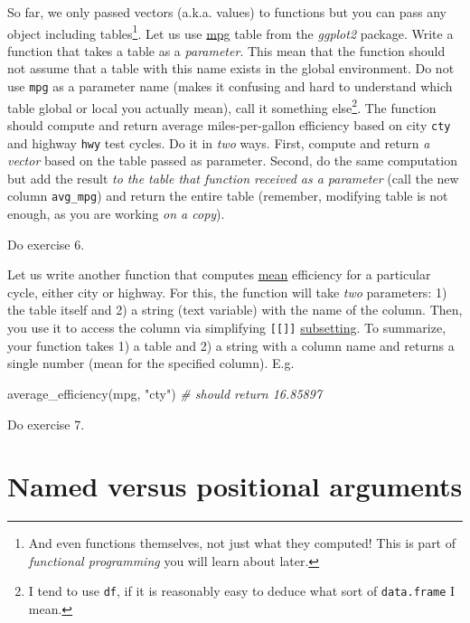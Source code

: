 \documentclass[
]{book}
\newenvironment{Shaded}{\begin{snugshade}}{\end{snugshade}}
\newcommand{\CommentTok}[1]{\textcolor[rgb]{0.56,0.35,0.01}{\textit{#1}}}
\newcommand{\FunctionTok}[1]{\textcolor[rgb]{0.00,0.00,0.00}{#1}}
\newcommand{\NormalTok}[1]{#1}
\newcommand{\StringTok}[1]{\textcolor[rgb]{0.31,0.60,0.02}{#1}}
\begin{document}
So far, we only passed vectors (a.k.a. values) to functions but you can pass any object including tables\footnote{And even functions themselves, not just what they computed! This is part of \emph{functional programming} you will learn about later.}. Let us use \href{https://ggplot2.tidyverse.org/reference/mpg.html}{mpg} table from the \emph{ggplot2} package. Write a function that takes a table as a \emph{parameter}. This mean that the function should not assume that a table with this name exists in the global environment. Do not use \texttt{mpg} as a parameter name (makes it confusing and hard to understand which table global or local you actually mean), call it something else\footnote{I tend to use \texttt{df}, if it is reasonably easy to deduce what sort of \texttt{data.frame} I mean.}. The function should compute and return average miles-per-gallon efficiency based on city \texttt{cty} and highway \texttt{hwy} test cycles. Do it in \emph{two} ways. First, compute and return \emph{a vector} based on the table passed as parameter. Second, do the same computation but add the result \emph{to the table that function received as a parameter} (call the new column \texttt{avg\_mpg}) and return the entire table (remember, modifying table is not enough, as you are working \emph{on a copy}).

Do exercise 6.

Let us write another function that computes \href{https://stat.ethz.ch/R-manual/R-devel/library/base/html/mean.html}{mean} efficiency for a particular cycle, either city or highway. For this, the function will take \emph{two} parameters: 1) the table itself and 2) a string (text variable) with the name of the column. Then, you use it to access the column via simplifying \texttt{{[}{[}{]}{]}} \protect\hyperlink{subsetting}{subsetting}. To summarize, your function takes 1) a table and 2) a string with a column name and returns a single number (mean for the specified column). E.g.

\begin{Shaded}
\begin{Highlighting}[]
\FunctionTok{average\_efficiency}\NormalTok{(mpg, }\StringTok{"cty"}\NormalTok{) }\CommentTok{\# should return 16.85897}
\end{Highlighting}
\end{Shaded}

Do exercise 7.

\hypertarget{named-versus-positional-arguments}{%
\section{Named versus positional arguments}\label{named-versus-positional-arguments}}
\end{document}
